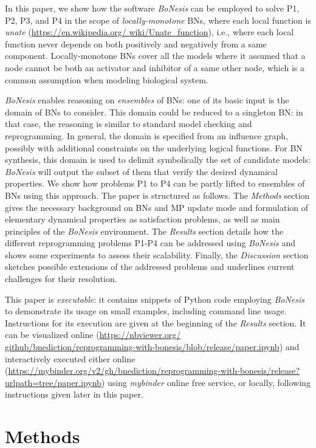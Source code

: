 \documentclass[PCJ,Unicode,screen,mode=plain]{cedram}
\begin{document}
In this paper, we show how the software \emph{BoNesis} can be employed
to solve P1, P2, P3, and P4 in the scope of \emph{locally-monotone} BNs,
where each local function is
\emph{{unate}}
(\href{https://en.wikipedia.org/wiki/Unate_function}{https://en.wikipedia.org/ wiki/Unate\_function}), i.e.,
where each local function never depends on both positively and
negatively from a same component. Locally-monotone BNs cover all the
models where it assumed that a node cannot be both an activator and
inhibitor of a same other node, which is a common assumption when
modeling biological system.

\emph{BoNesis} enables reasoning on \emph{ensembles} of BNs: one of its
basic input is the domain of BNs to consider. This domain could be
reduced to a singleton BN: in that case, the reasoning is similar to
standard model checking and reprogramming. In general, the domain is
specified from an influence graph, possibly with additional constraints
on the underlying logical functions. For BN synthesis, this domain is
used to delimit symbolically the set of candidate models: \emph{BoNesis}
will output the subset of them that verify the desired dynamical
properties. We show how problems P1 to P4 can be partly lifted to
ensembles of BNs using this approach.
The paper is structured as follows. The \emph{Methods} section gives the
necessary background on BNs and MP update mode and formulation of
elementary dynamical properties as satisfaction problems, as well as
main principles of the \emph{BoNesis} environment. The \emph{Results}
section details how the different reprogramming problems P1-P4 can be
addressed using \emph{BoNesis} and shows some experiments to assess
their scalability. Finally, the \emph{Discussion} section sketches
possible extensions of the addressed problems and underlines current
challenges for their resolution.

This paper is \emph{executable}: it contains snippets of Python code
employing \emph{BoNesis} to demonstrate its usage on small examples,
including command line usage. Instructions for its execution are given
at the beginning of the \emph{Results} section. It can be visualized
online
(\href{https://nbviewer.org/github/bnediction/reprogramming-with-bonesis/blob/release/paper.ipynb}{https://nbviewer.org/ github/bnediction/reprogramming-with-bonesis/blob/release/paper.ipynb})
and interactively executed either online 
(\href{https://mybinder.org/v2/gh/bnediction/reprogramming-with-bonesis/release?urlpath=tree/paper.ipynb}{https://mybinder.org/v2/gh/bnediction/reprogramming-with-bonesis/\-rele\-ase?urlpath=tree/paper.ipynb})
using \emph{mybinder} online free service, or
locally, following instructions given later in this paper.
\hypertarget{methods}{%
\section{Methods}\label{methods}}
\end{document}
